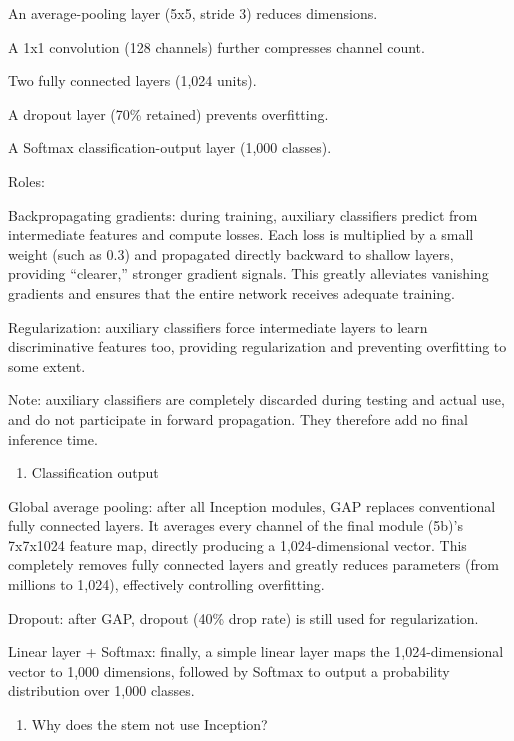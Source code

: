 An average-pooling layer (5x5, stride 3) reduces dimensions.

A 1x1 convolution (128 channels) further compresses channel count.

Two fully connected layers (1,024 units).

A dropout layer (70\% retained) prevents overfitting.

A Softmax classification-output layer (1,000 classes).

Roles:

Backpropagating gradients: during training, auxiliary classifiers predict from intermediate features and compute losses. Each loss is multiplied by a small weight (such as 0.3) and propagated directly backward to shallow layers, providing ``clearer,'' stronger gradient signals. This greatly alleviates vanishing gradients and ensures that the entire network receives adequate training.

Regularization: auxiliary classifiers force intermediate layers to learn discriminative features too, providing regularization and preventing overfitting to some extent.

Note: auxiliary classifiers are completely discarded during testing and actual use, and do not participate in forward propagation. They therefore add no final inference time.

\begin{enumerate}
\def\labelenumi{\arabic{enumi}.}
\setcounter{enumi}{3}
\tightlist
\item
  Classification output
\end{enumerate}

Global average pooling: after all Inception modules, GAP replaces conventional fully connected layers. It averages every channel of the final module (5b)'s 7x7x1024 feature map, directly producing a 1,024-dimensional vector. This completely removes fully connected layers and greatly reduces parameters (from millions to 1,024), effectively controlling overfitting.

Dropout: after GAP, dropout (40\% drop rate) is still used for regularization.

Linear layer + Softmax: finally, a simple linear layer maps the 1,024-dimensional vector to 1,000 dimensions, followed by Softmax to output a probability distribution over 1,000 classes.

\begin{enumerate}
\def\labelenumi{\arabic{enumi}.}
\setcounter{enumi}{4}
\tightlist
\item
  Why does the stem not use Inception?
\end{enumerate}

